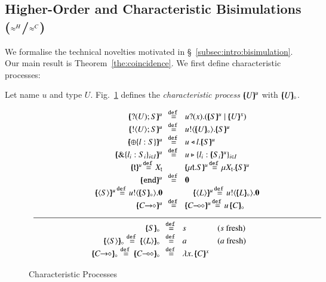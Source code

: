 \subsection{Higher-Order  and  
Characteristic  Bisimulations ($\approx^H$/$\approx^C$)}\label{ss:hwb}
\noi 
We formalise the technical novelties motivated in \S~\ref{subsec:intro:bisimulation}.
Our main result is Theorem~\ref{the:coincidence}.
We first define characteristic processes:
   
\begin{definition}\rm
\label{def:char}
	Let name $u$ and type $U$. 
	Fig.~\ref{fig:char} defines the {\em characteristic process} 
	$[\!\!(U)\!\!]^{u}$ with %
	$[\!\!(U)\!\!]_{\circ}$. 
\end{definition}

\smallskip

\begin{figure}[t]
	\[
	\begin{array}{c}
		\begin{array}{rclcl}
			\mapchar{\btinp{U} S}{u} &\!\!\defeq\!\!
& \binp{u}{x} (\mapchar{S}{u} \Par \mapchar{U}{x})
			\\
			\mapchar{\btout{U} S}{u} &\!\!\defeq\!\!& \bout{u}{\omapchar{U}} \mapchar{S}{u} %
			\\
			\mapchar{\btsel{l : S}}{u} &\!\!\defeq\!\!& \bsel{u}{l} \mapchar{S}{u}
			\\
			\mapchar{\btbra{l_i: S_i}_{i \in I}}{u} &\!\!\defeq\!\!& \bbra{u}{l_i: \mapchar{S_i}{u}}_{i \in I}
			\\
		\mapchar{\tvar{t}}{u} \!\defeq\! \varp{X}_{\vart{t}}
& & 
			\mapchar{\trec{t}{S}}{u} \!\defeq\! \recp{X_{\vart{t}}}{\mapchar{S}{u}}
			\\
			\mapchar{\tinact}{u} &\!\!\defeq\!\!& \inact
			\\
\mapchar{\chtype{S}}{u} \!\defeq\! \bout{u}{\omapchar{S}} \inact & & 
\quad\mapchar{\chtype{L}}{u} \!\defeq\! \bout{u}{\omapchar{L}} \inact
			\\
\mapchar{\shot{C}}{u} & \!\!\defeq\!\! & \mapchar{\lhot{C}}{u} \!\defeq\! 
\appl{u}{\omapchar{C}}
\end{array}
\\
\Hline
\\
		\begin{array}{rcll}
\omapchar{S} &\!\!\defeq\!\!& s & (s \textrm{ fresh})
			\\
\omapchar{\chtype{S}} \defeq \omapchar{\chtype{L}} &\!\!\defeq\!\!& a & 
(a \textrm{ fresh})\quad\quad
			\\
			\omapchar{\shot{C}} \defeq \omapchar{\lhot{C}} &\!\!\defeq\!\!& \abs{x}{\mapchar{C}{x}}
		\end{array}
	\end{array}
	\]
\caption{Characteristic Processes \label{fig:char}}
\Hline
\end{figure}

